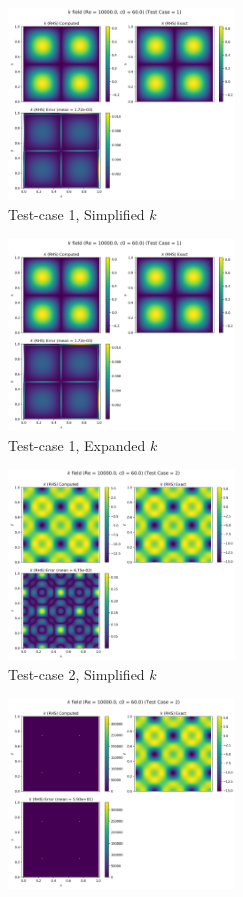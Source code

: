 \begin{figure}[H]
  \begin{subfigure}{7cm}
    \centering\includegraphics[width=6cm]{Code-Figures/keps/keps-op-conv/c0_60_ke_expd_no_ketc_1_nx_150_re_10000/k_rhs.png}
    \caption{Test-case 1, Simplified $k$}
  \end{subfigure}
  \begin{subfigure}{7cm}
    \centering\includegraphics[width=6cm]{Code-Figures/keps/keps-op-conv/c0_60_ke_expd_yes_ketc_1_nx_150_re_10000/k_rhs.png}
    \caption{Test-case 1, Expanded $k$}
  \end{subfigure}
  \begin{subfigure}{7cm}
    \centering\includegraphics[width=6cm]{Code-Figures/keps/keps-op-conv/c0_60_ke_expd_no_ketc_2_nx_150_re_10000/k_rhs.png}
    \caption{Test-case 2, Simplified $k$}
  \end{subfigure}
  \begin{subfigure}{7cm}
    \centering\includegraphics[width=6cm]{Code-Figures/keps/keps-op-conv/c0_60_ke_expd_yes_ketc_2_nx_150_re_10000/k_rhs.png}

\end{subfigure}
\end{figure}
